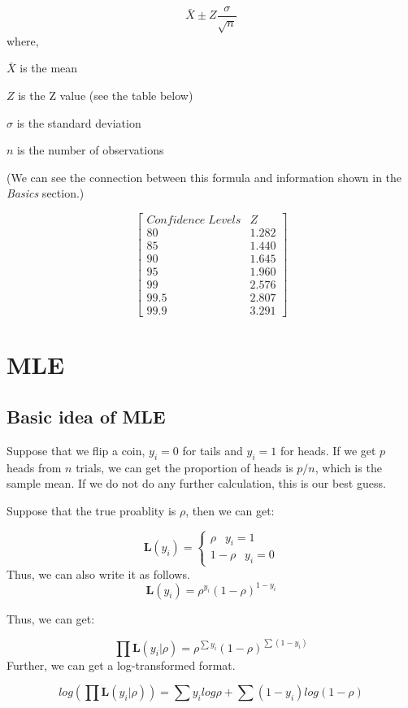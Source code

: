 \documentclass[
]{book}
\begin{document}
\[\bar{X} \pm Z \frac{\sigma}{\sqrt{n}}\]
where,

\(\bar{X}\) is the mean

\(Z\) is the Z value (see the table below)

\(\sigma\) is the standard deviation

\(n\) is the number of observations

(We can see the connection between this formula and information shown in the \emph{Basics} section.)

\[\begin{bmatrix}
Confidence \; Levels & Z \\
80  & 1.282 \\
85 & 1.440 \\
90 & 1.645 \\
95 & 1.960 \\
99 & 2.576 \\
99.5 & 2.807 \\
99.9 & 3.291 \end{bmatrix}\]

\hypertarget{intro}{%
\chapter{MLE}\label{intro}}

\hypertarget{basic-idea-of-mle}{%
\section{Basic idea of MLE}\label{basic-idea-of-mle}}

Suppose that we flip a coin, \(y_i=0\) for tails and \(y_i=1\) for heads. If we get \(p\) heads from \(n\) trials, we can get the proportion of heads is \(p/n\), which is the sample mean. If we do not do any further calculation, this is our best guess.

Suppose that the true proablity is \(\rho\), then we can get:

\[
\mathbf{L}(y_i)=\begin{cases} \rho \;\;\:   y_i = 1 \\ 1-\rho \;\;\:  y_i = 0 \end{cases}
\]
Thus, we can also write it as follows.
\[\mathbf{L}(y_i) = \rho^{y_i}(1-\rho)^{1-y_i}\]

Thus, we can get:

\[\prod \mathbf{L}(y_i|\rho)=\rho^{\sum y_i}(1-\rho)^{\sum(1-y_i)}\]
Further, we can get a log-transformed format.

\[log (\prod \mathbf{L}(y_i|\rho))=\sum y_i log \rho + \sum(1-y_i) log(1-\rho)\]
\end{document}
